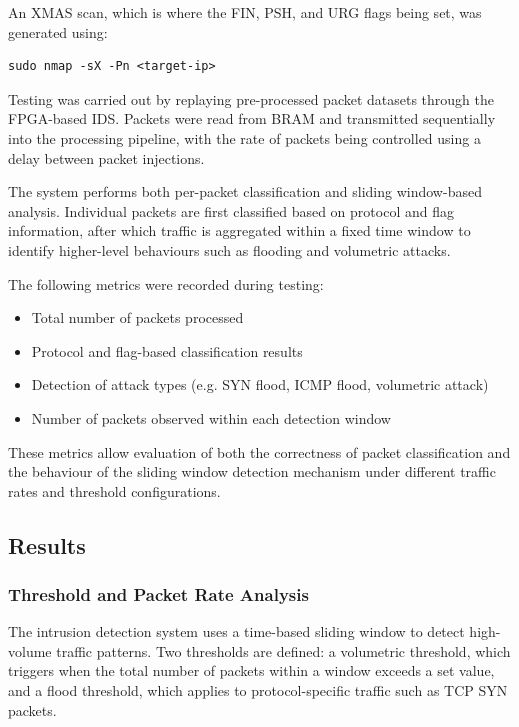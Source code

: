An XMAS scan, which is where the FIN, PSH, and URG flags being set, was
generated using:

\begin{verbatim}
sudo nmap -sX -Pn <target-ip>
\end{verbatim}

Testing was carried out by replaying pre-processed packet datasets through the
FPGA-based IDS. Packets were read from BRAM and transmitted sequentially into
the processing pipeline, with the rate of packets being controlled using a
delay between packet injections.

The system performs both per-packet classification and sliding window-based
analysis. Individual packets are first classified based on protocol and flag
information, after which traffic is aggregated within a fixed time window to
identify higher-level behaviours such as flooding and volumetric attacks.

The following metrics were recorded during testing:

\begin{itemize}
    \item Total number of packets processed
    \item Protocol and flag-based classification results
    \item Detection of attack types (e.g. SYN flood, ICMP flood, volumetric attack)
    \item Number of packets observed within each detection window
\end{itemize}

These metrics allow evaluation of both the correctness of packet classification
and the behaviour of the sliding window detection mechanism under different
traffic rates and threshold configurations.
\subsection{Results}
\subsubsection{Threshold and Packet Rate Analysis}

The intrusion detection system uses a time-based sliding window to detect
high-volume traffic patterns. Two thresholds are defined: a volumetric
threshold, which triggers when the total number of packets within a window
exceeds a set value, and a flood threshold, which applies to protocol-specific
traffic such as TCP SYN packets.


